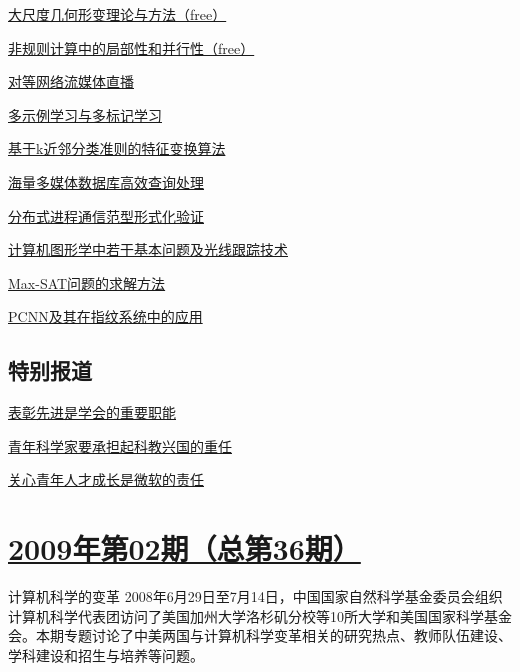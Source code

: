 \documentclass[a4paper]{article}
\begin{document}
\href{http://history.ccf.org.cn/resources/1190201776262/2010/04/15/037012.pdf}{大尺度几何形变理论与方法（free）}

\href{http://history.ccf.org.cn/resources/1190201776262/2010/04/15/037019.pdf}{非规则计算中的局部性和并行性（free）}

\href{http://history.ccf.org.cn/resources/1190201776262/2010/04/15/037027.pdf}{对等网络流媒体直播}

\href{http://history.ccf.org.cn/resources/1190201776262/2010/04/15/037036.pdf}{多示例学习与多标记学习}

\href{http://history.ccf.org.cn/resources/1190201776262/2010/04/15/037044.pdf}{基于k近邻分类准则的特征变换算法}

\href{http://history.ccf.org.cn/resources/1190201776262/2010/04/15/037052.pdf}{海量多媒体数据库高效查询处理}

\href{http://history.ccf.org.cn/resources/1190201776262/2010/04/15/037061.pdf}{分布式进程通信范型形式化验证}

\href{http://history.ccf.org.cn/resources/1190201776262/2010/04/15/037068.pdf}{计算机图形学中若干基本问题及光线跟踪技术}

\href{http://history.ccf.org.cn/resources/1190201776262/2010/04/15/037077.pdf}{Max-SAT问题的求解方法}

\href{http://history.ccf.org.cn/resources/1190201776262/2010/04/15/037084.pdf}{PCNN及其在指纹系统中的应用}

\subsection{特别报道}
\href{http://history.ccf.org.cn/resources/1190201776262/2010/04/15/037008.pdf}{表彰先进是学会的重要职能}

\href{http://history.ccf.org.cn/resources/1190201776262/2010/04/15/037006.pdf}{青年科学家要承担起科教兴国的重任}

\href{http://history.ccf.org.cn/resources/1190201776262/2010/04/15/037007.pdf}{关心青年人才成长是微软的责任}


\section{\href{http://history.ccf.org.cn/sites/ccf/jsjtbbd.jsp?contentId=2542567629025}{\textbf{2009年第02期（总第36期）}}}
计算机科学的变革 2008年6月29日至7月14日，中国国家自然科学基金委员会组织计算机科学代表团访问了美国加州大学洛杉矶分校等10所大学和美国国家科学基金会。本期专题讨论了中美两国与计算机科学变革相关的研究热点、教师队伍建设、学科建设和招生与培养等问题。
\end{document}
